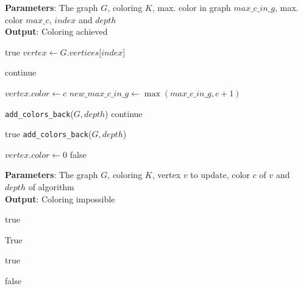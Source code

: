 \documentclass{article}
\begin{document}
\begin{algorithm}[tb]
	\caption{\texttt{can\_color\_with\_max\_c}}
	\label{alg:check}
	\textbf{Parameters}: The graph $G$, coloring $K$, max. color in graph $max\_c\_in\_g$, max. color $max\_c$, $index$ and $depth$\\
	\textbf{Output}: Coloring achieved
	\begin{algorithmic}[1]
		\RETURN true
		\ENDIF
		\STATE $vertex \gets G.vertices$[$index$]
		
		\STATE continue
		\ENDIF
		
		\STATE $vertex.color \gets c$
		\STATE $new\_max\_c\_in\_g \gets \max(max\_c\_in\_g, c + 1)$
		
		
		\STATE \texttt{add\_colors\_back}($G, depth$)
		\STATE continue
		\ENDIF
		
		\RETURN true
		\ENDIF
		\STATE \texttt{add\_colors\_back}($G, depth$)
		
		\ENDFOR
		
		\STATE $vertex.color \gets 0$
		\RETURN false
	\end{algorithmic}
\end{algorithm}

\begin{algorithm}[tb]
	\caption{\texttt{update\_neighbors}}
	\label{alg:updateN}
	\textbf{Parameters}: The graph $G$, coloring $K$, vertex $v$ to update, color $c$ of $v$ and $depth$ of algorithm \\
	\textbf{Output}: Coloring impossible
	\begin{algorithmic}[1]
		
		
		
		\RETURN true 
		\ENDIF
		\ENDIF
		
		
		\RETURN True
		
		\RETURN true
		
		\ENDIF
		\ENDIF
		\ENDFOR
		\RETURN false
	\end{algorithmic}
\end{algorithm}
\end{document}
